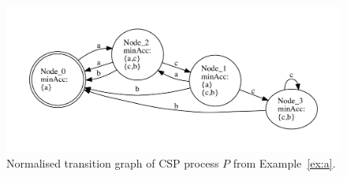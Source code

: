  \begin{figure}
 \begin{center}
\includegraphics[width=\textwidth]{q0.pdf}
\end{center}
\caption{Normalised transition graph of CSP process $P$ from Example~\ref{ex:a}.}
 \label{fig:tga}
 \end{figure}

